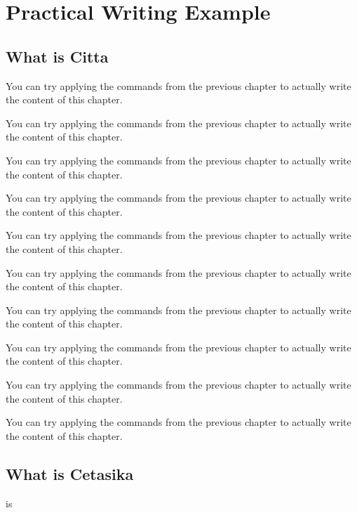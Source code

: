 \chapter{Practical Writing Example}
\starthere

\section{What is Citta}
You can try applying the commands from the previous chapter to actually write the content of this chapter.

You can try applying the commands from the previous chapter to actually write the content of this chapter.

You can try applying the commands from the previous chapter to actually write the content of this chapter.

You can try applying the commands from the previous chapter to actually write the content of this chapter.

You can try applying the commands from the previous chapter to actually write the content of this chapter.

You can try applying the commands from the previous chapter to actually write the content of this chapter.

You can try applying the commands from the previous chapter to actually write the content of this chapter.

You can try applying the commands from the previous chapter to actually write the content of this chapter.

You can try applying the commands from the previous chapter to actually write the content of this chapter.

You can try applying the commands from the previous chapter to actually write the content of this chapter.

\section{What is Cetasika}
 is \peyyala{}

\commentarytable%
